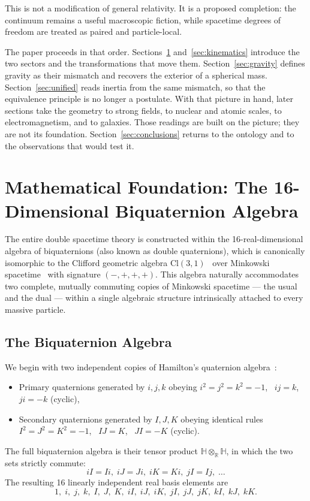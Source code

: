 \documentclass[a4paper]{article}
\begin{document}
This is not a modification of general relativity. It is a proposed completion: the continuum remains a useful macroscopic fiction, while spacetime degrees of freedom are treated as paired and particle-local.

The paper proceeds in that order. Sections~\ref{sec:math} and~\ref{sec:kinematics} introduce the two sectors and the transformations that move them. Section~\ref{sec:gravity} defines gravity as their mismatch and recovers the exterior of a spherical mass. Section~\ref{sec:unified} reads inertia from the same mismatch, so that the equivalence principle is no longer a postulate. With that picture in hand, later sections take the geometry to strong fields, to nuclear and atomic scales, to electromagnetism, and to galaxies. Those readings are built on the picture; they are not its foundation. Section~\ref{sec:conclusions} returns to the ontology and to the observations that would test it.

\section{Mathematical Foundation: The 16-Dimensional Biquaternion Algebra}
\label{sec:math}

The entire double spacetime theory is constructed within the 16-real-dimensional algebra of biquaternions (also known as double quaternions), which is canonically isomorphic to the Clifford geometric algebra $\mathrm{Cl}(3,1)$~\cite{clifford1878} over Minkowski spacetime~\cite{minkowski1909} with signature $(-,+,+,+)$. This algebra naturally accommodates two complete, mutually commuting copies of Minkowski spacetime — the usual and the dual — within a single algebraic structure intrinsically attached to every massive particle.

\subsection{The Biquaternion Algebra}

We begin with two independent copies of Hamilton's quaternion algebra~\cite{hamilton1844}:
\begin{itemize}
  \item Primary quaternions generated by $i,j,k$ obeying $i^2=j^2=k^2=-1$, \ $ij=k$, \ $ji=-k$ (cyclic),
  \item Secondary quaternions generated by $I,J,K$ obeying identical rules $I^2=J^2=K^2=-1$, \ $IJ=K$, \ $JI=-K$ (cyclic).
\end{itemize}
The full biquaternion algebra is their tensor product $\mathbb{H} \otimes_{\mathbb{R}} \mathbb{H}$, in which the two sets strictly commute:
\[
iI = Ii,\; iJ = Ji,\; iK = Ki,\; jI = Ij,\; \dots
\]
The resulting 16 linearly independent real basis elements are
\[
1,\; i,\; j,\; k,\; I,\; J,\; K,\; iI,\; iJ,\; iK,\; jI,\; jJ,\; jK,\; kI,\; kJ,\; kK.
\]
\end{document}
